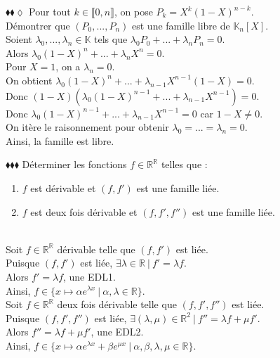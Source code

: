 \documentclass[11pt]{article}
\newcommand*{\R}{\mathbb{R}}
\newcommand*{\K}{\mathbb{K}}
\begin{document}
\begin{exercise}{$\blacklozenge\blacklozenge\lozenge$}{}
    Pour tout $k \in \llbracket 0, n \rrbracket$, on pose $P_k = X^k(1-X)^{n-k}$.\\
    Démontrer que $(P_0, ..., P_n)$ est une famille libre de $\K_n[X]$.
    \tcblower\\[0.2cm]
    Soient $\lambda_0, ..., \lambda_n \in \K$ tels que $\lambda_0P_0 + ... + \lambda_nP_n = 0$.\\ 
    Alors $\lambda_0(1-X)^n + ... + \lambda_nX^n = 0$.\\
    Pour $X = 1$, on a $\lambda_n = 0$.\\
    On obtient $\lambda_0(1-X)^n + ... + \lambda_{n-1}X^{n-1}(1-X) = 0$.\\
    Donc $(1-X)\left(\lambda_0(1-X)^{n-1} + ... + \lambda_{n-1}X^{n-1}\right) = 0$.\\
    Donc $\lambda_0(1-X)^{n-1} + ... + \lambda_{n-1}X^{n-1} = 0$ car $1-X \neq 0$.\\
    On itère le raisonnement pour obtenir $\lambda_0 = ... = \lambda_{n} = 0$.\\
    Ainsi, la famille est libre.
\end{exercise}

\begin{exercise}{$\blacklozenge\blacklozenge\blacklozenge$}{}
    Déterminer les fonctions $f\in\R^\R$ telles que :
    \begin{enumerate}[topsep=0pt,itemsep=-0.9ex]
        \item $f$ est dérivable et $(f,f')$ est une famille liée.
        \item $f$ est deux fois dérivable et $(f, f', f'')$ est une famille liée.
    \end{enumerate}
    \tcblower\\[0.2cm]
     Soit $f\in\R^\R$ dérivable telle que $(f, f')$ est liée.\\
    Puisque $(f,f')$ est liée, $\exists \lambda \in \R ~ | ~ f' = \lambda f$.\\
    Alors $f' = \lambda f$, une EDL1.\\
    Ainsi, $f \in \{x \mapsto \alpha e^{\lambda x} ~ | ~ \alpha, \lambda \in \R\}$.\\[0.3cm]
     Soit $f\in\R^\R$ deux fois dérivable telle que $(f, f', f'')$ est liée.\\
    Puisque $(f, f', f'')$ est liée, $\exists (\lambda, \mu) \in \R^2 ~ | ~ f'' = \lambda f + \mu f'$.\\
    Alors $f'' = \lambda f + \mu f'$, une EDL2.\\
    Ainsi, $f \in \{ x \mapsto \alpha e^{\lambda x} + \beta e^{\mu x} ~ | ~ \alpha, \beta, \lambda, \mu \in \R\}$.
\end{exercise}
\end{document}
